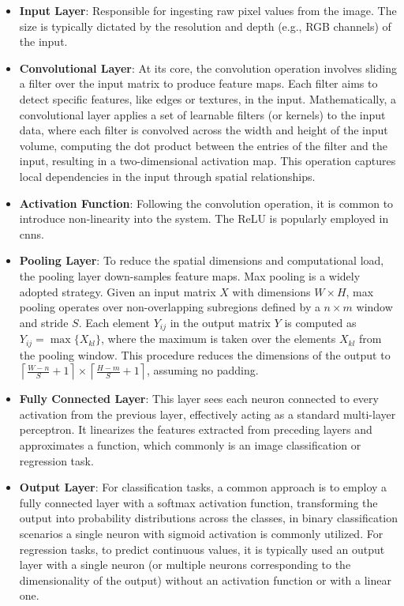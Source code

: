 \begin{itemize}
	\item \textbf{Input Layer}: Responsible for ingesting raw pixel values from the image. The size is typically dictated by the resolution and depth (e.g., RGB channels) of the input.
	
	\item \textbf{Convolutional Layer}: At its core, the convolution operation involves sliding a filter over the input matrix to produce feature maps. Each filter aims to detect specific features, like edges or textures, in the input. Mathematically, a convolutional layer applies a set of learnable filters (or kernels) to the input data, where each filter is convolved across the width and height of the input volume, computing the dot product between the entries of the filter and the input, resulting in a two-dimensional activation map. This operation captures local dependencies in the input through spatial relationships.
	
	\item \textbf{Activation Function}: Following the convolution operation, it is common to introduce non-linearity into the system. The ReLU is popularly employed in \glspl{cnn}.
	
	\item \textbf{Pooling Layer}: To reduce the spatial dimensions and computational load, the pooling layer down-samples feature maps. Max pooling is a widely adopted strategy. Given an input matrix \(X\) with dimensions \(W \times H\), max pooling operates over non-overlapping subregions defined by a \(n \times m\) window and stride \(S\). Each element \(Y_{ij}\) in the output matrix \(Y\) is computed as \(Y_{ij} = \max \{X_{kl}\}\), where the maximum is taken over the elements \(X_{kl}\) from the pooling window. This procedure reduces the dimensions of the output to \(\left\lceil \frac{W - n}{S} + 1 \right\rceil \times \left\lceil \frac{H - m}{S} + 1 \right\rceil\), assuming no padding.
	
	\item \textbf{Fully Connected Layer}: This layer sees each neuron connected to every activation from the previous layer, effectively acting as a standard multi-layer perceptron. It linearizes the features extracted from preceding layers and approximates a function, which commonly is an image classification or regression task.
	
	\item \textbf{Output Layer}: For classification tasks, a common approach is to employ a fully connected layer with a softmax activation function, transforming the output into probability distributions across the classes, in binary classification scenarios a single neuron with sigmoid activation is commonly utilized. For regression tasks, to predict continuous values, it is typically used an output layer with a single neuron (or multiple neurons corresponding to the dimensionality of the output) without an activation function or with a linear one. 
\end{itemize}

